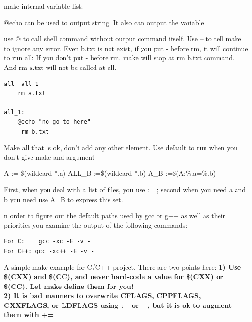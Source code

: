 \documentclass[paper=8.5in:11in, twoside, 12pt, pagesize=pdftex]{book}
\begin{document}
make internal variable list:

	 @echo can be used to output string. It also can output the variable

		use @ to call shell command without output command itself. Use – to tell make to ignore any error. Even b.txt is not exist, if you put - before rm, it will continue to run all: If you don't put - before rm. make will stop at rm b.txt command. And rm a.txt will not be called at all.  
\begin{lstlisting}
all: all_1
	rm a.txt
	 
all_1:
	@echo "no go to here"
	-rm b.txt
\end{lstlisting}		
		
		
		Make all that is ok, don't add any other element. Use default to run when you don't give make and argument

		A := \$(wildcard *.a)  ALL\_B :=\$(wildcard *.b)  A\_B :=\$(A:\%.a=\%.b)
		
		First, when you deal with a list of files, you use := ; second when you need a and b you need use A\_B to express this set.
		
		n order to figure out the default paths used by gcc or g++ as well as their priorities you examine the output of the following commands:
\begin{verbatim}
For C:    gcc -xc -E -v -
For C++: gcc -xc++ -E -v -
\end{verbatim}

	A simple make example for C/C++ project. There are two points here: \textbf{1) Use \$(CXX) and \$(CC), and never hard-code a value for \$(CXX) or \$(CC). Let make define them for you! } \\

\textbf{2) It is bad manners to overwrite CFLAGS, CPPFLAGS, CXXFLAGS, or LDFLAGS using := or =, but it is ok to augment them with += }
\end{document}
